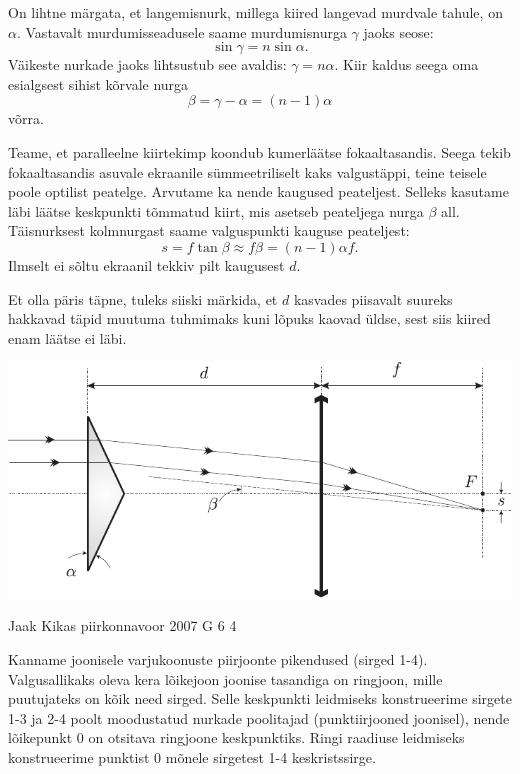 \documentclass[11pt, twoside]{article}
\begin{document}
{{On lihtne märgata, et langemisnurk, millega kiired langevad murdvale tahule, on $\alpha$. 
Vastavalt murdumisseadusele saame murdumisnurga $\gamma$ jaoks seose:
\[
\sin \gamma = n \sin \alpha.
\]
Väikeste nurkade jaoks lihtsustub see avaldis: $\gamma = n\alpha$. Kiir kaldus seega oma esialgsest sihist kõrvale nurga
\[
\beta = \gamma - \alpha = (n - 1) \alpha
\]
võrra. 

Teame, et paralleelne kiirtekimp koondub kumerläätse fokaaltasandis. Seega tekib fokaaltasandis asuvale ekraanile sümmeetriliselt kaks valgustäppi, teine teisele poole optilist peatelge. Arvutame ka nende kaugused peateljest. Selleks kasutame läbi läätse keskpunkti tõmmatud kiirt, mis asetseb peateljega nurga $\beta$ all. Täisnurksest kolmnurgast saame valguspunkti kauguse peateljest:
\[
s = f \tan \beta \approx f \beta = (n - 1)\alpha f.
\]
Ilmselt ei sõltu ekraanil tekkiv pilt kaugusest $d$.

Et olla päris täpne, tuleks siiski märkida, et $d$ kasvades piisavalt suureks hakkavad täpid muutuma tuhmimaks kuni lõpuks kaovad üldse, sest siis kiired enam läätse ei läbi.

\begin{center}
	\includegraphics[width=\linewidth]{2006-v2g-06-lah}
\end{center}
\fi
}

{Jaak Kikas} %
{piirkonnavoor} %
{2007} %
{G 6} %
{4} %
{

\ifSolution
Kanname joonisele varjukoonuste piirjoonte pikendused (sirged 1-4). Valgusallikaks oleva kera lõikejoon joonise tasandiga on ringjoon, mille puutujateks on kõik need sirged. Selle keskpunkti leidmiseks konstrueerime sirgete 1-3 ja 2-4 poolt moodustatud nurkade poolitajad (punktiirjooned joonisel), nende lõikepunkt 0 on otsitava ringjoone keskpunktiks. Ringi raadiuse leidmiseks konstrueerime punktist 0 mõnele sirgetest 1-4 keskristssirge.

}}
\end{document}

